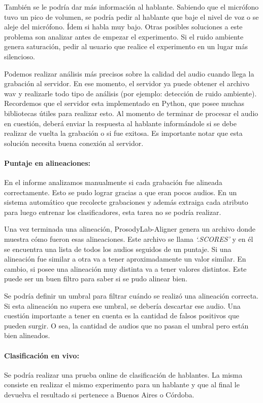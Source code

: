También se le podría dar más información al hablante. Sabiendo que el micrófono tuvo un pico de volumen, se podría pedir al hablante que baje el nivel de voz o se aleje del micrófono. Ídem si habla muy bajo. Otras posibles soluciones a este problema son analizar antes de empezar el experimento. Si el ruido ambiente genera saturación, pedir al usuario que realice el experimento en un lugar más silencioso. 

Podemos realizar análisis más precisos sobre la calidad del audio cuando llega la grabación al servidor. En ese momento, el servidor ya puede obtener el archivo wav y realizarle todo tipo de análisis (por ejemplo: detección de ruido ambiente). Recordemos que el servidor esta implementado en Python, que posee muchas bibliotecas útiles para realizar esto. Al momento de terminar de procesar el audio en cuestión, deberá enviar la respuesta al hablante informándole si se debe realizar de vuelta la grabación o si fue exitosa. Es importante notar que esta solución necesita buena conexión al servidor. 

\paragraph*{Puntaje en alineaciones:} En el informe analizamos manualmente si cada grabación fue alineada correctamente. Esto se pudo lograr gracias a que eran pocos audios. En un sistema automático que recolecte grabaciones y además extraiga cada atributo para luego entrenar los clasificadores, esta tarea no se podría realizar.     

Una vez terminada una alineación, ProsodyLab-Aligner genera un archivo donde muestra cómo fueron esas alineaciones. Este archivo se llama \textit{`.SCORES’} y en él se encuentra una lista de todos los audios seguidos de un puntaje. Si una alineación fue similar a otra va a tener aproximadamente un valor similar. En cambio, si posee una alineación muy distinta va a tener valores distintos. Este puede ser un buen filtro para saber si se pudo alinear bien.

Se podría definir un umbral para filtrar cuándo se realizó una alineación correcta. Si esta alineación no supera ese umbral, se debería descartar ese audio. Una cuestión importante a tener en cuenta es la cantidad de falsos positivos que pueden surgir. O sea, la cantidad de audios que no pasan el umbral pero están bien alineados.   

\paragraph*{Clasificación en vivo:} Se podría realizar una prueba online de clasificación de hablantes. La misma consiste en realizar el mismo experimento para un hablante y que al final le devuelva el resultado si pertenece a Buenos Aires o Córdoba.

